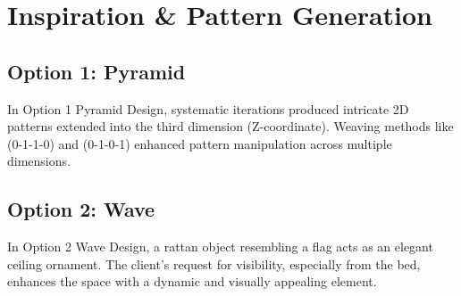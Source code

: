 \section*{
  Inspiration \& Pattern Generation
 }
\vspace{-\baselineskip}%
\setlength{\columnsep}{0.25cm}%
\begin{multicols}{2}
	\subsection*{
		Option 1: Pyramid
	}
	
	\vfill
	
	\vspace{0.125cm}%
	In Option 1 Pyramid Design, systematic iterations produced intricate 2D patterns extended into the third dimension (Z-coordinate). Weaving methods like (0-1-1-0) and (0-1-0-1) enhanced pattern manipulation across multiple dimensions.
	\vspace*{\baselineskip}
	
	\columnbreak%
	\subsection*{
		Option 2: Wave
	}
	
	\vfill
	
	\vspace{0.125cm}%
	In Option 2 Wave Design, a rattan object resembling a flag acts as an elegant ceiling ornament. The client's request for visibility, especially from the bed, enhances the space with a dynamic and visually appealing element.
	\vspace*{\baselineskip}
	
\end{multicols}
\columnbreak%
